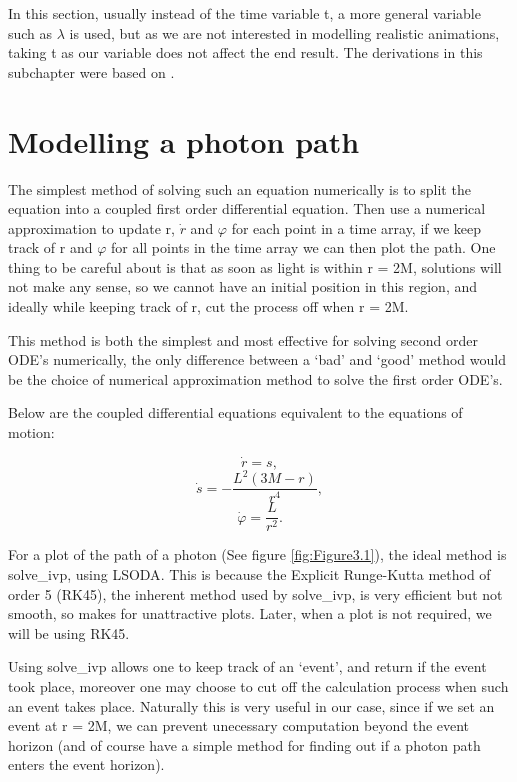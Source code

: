 \documentclass[oneside,openright,frontopenright, singlespacing]{dmathesis}
\begin{document}
\vspace{1em}
	In this section, usually instead of the time variable t, a more general variable such as $\lambda$ is used, but as we are not interested in modelling realistic animations, taking t as our variable does not affect the end result. The derivations in this subchapter were based on \cite[pg. 283-285]{schutz2009first}.

\section{Modelling a photon path}\label{sec:Section3.4}

	The simplest method of solving such an equation numerically is to split the equation into a coupled first order differential equation. Then use a numerical approximation to update r, $\dot{r}$ and $\varphi$ for each point in a time array, if we keep track of r and $\varphi$ for all points in the time array we can then plot the path. One thing to be careful about is that as soon as light is within r = 2M, solutions will not make any sense, so we cannot have an initial position in this region, and ideally while keeping track of r, cut the process off when r = 2M.

\vspace{1em}
	This method is both the simplest and most effective for solving second order ODE’s numerically, the only difference between a ‘bad’ and ‘good’ method would be the choice of numerical approximation method to solve the first order ODE’s.

\vspace{1em}
	Below are the coupled differential equations equivalent to the equations of motion:

	\[\dot{r}= s,\]
	\[\dot{s}=-\frac{L^2(3M-r)}{r^4},\]
	\[\dot{\varphi}=\frac{L}{r^2}.\]

\vspace{1em}
	For a plot of the path of a photon (See figure \ref{fig:Figure3.1}), the ideal method is solve\_ivp\cite{2020SciPy-NMeth}, using LSODA\cite{hindmarsh2005lsoda}. This is because the Explicit Runge-Kutta method of order 5 (RK45)\cite{fehlberg1969low}, the inherent method used by solve\_ivp, is very efficient but not smooth, so makes for unattractive plots. Later, when a plot is not required, we will be using RK45.

\vspace{1em}
	Using solve\_ivp allows one to keep track of an ‘event’, and return if the event took place, moreover one may choose to cut off the calculation process when such an event takes place. Naturally this is very useful in our case, since if we set an event at r = 2M, we can prevent unecessary computation beyond the event horizon (and of course have a simple method for finding out if a photon path enters the event horizon).
\end{document}
